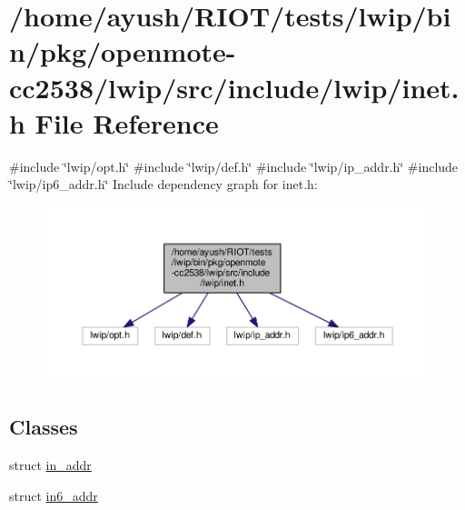 \hypertarget{openmote-cc2538_2lwip_2src_2include_2lwip_2inet_8h}{}\section{/home/ayush/\+R\+I\+O\+T/tests/lwip/bin/pkg/openmote-\/cc2538/lwip/src/include/lwip/inet.h File Reference}
\label{openmote-cc2538_2lwip_2src_2include_2lwip_2inet_8h}
{\ttfamily \#include \char`\"{}lwip/opt.\+h\char`\"{}}\newline
{\ttfamily \#include \char`\"{}lwip/def.\+h\char`\"{}}\newline
{\ttfamily \#include \char`\"{}lwip/ip\+\_\+addr.\+h\char`\"{}}\newline
{\ttfamily \#include \char`\"{}lwip/ip6\+\_\+addr.\+h\char`\"{}}\newline
Include dependency graph for inet.\+h\+:
\nopagebreak
\begin{figure}[H]
\begin{center}
\leavevmode
\includegraphics[width=350pt]{openmote-cc2538_2lwip_2src_2include_2lwip_2inet_8h__incl}
\end{center}
\end{figure}
\subsection*{Classes}
\begin{DoxyCompactItemize}
\item 
struct \hyperlink{structin__addr}{in\+\_\+addr}
\item 
struct \hyperlink{structin6__addr}{in6\+\_\+addr}
\end{DoxyCompactItemize}

